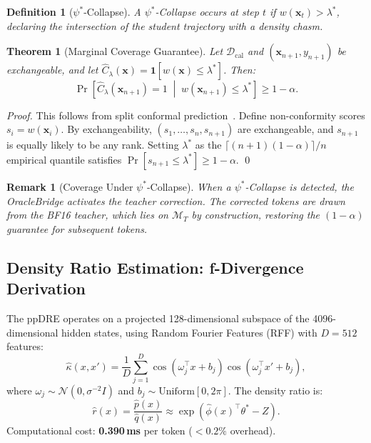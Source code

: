 \documentclass{uai2026}  %
\newtheorem{theorem}{Theorem}
\newtheorem{definition}{Definition}
\newtheorem{remark}{Remark}
\begin{document}
\begin{definition}[$\psi^*$-Collapse]
A $\psi^*$\emph{-Collapse} occurs at step $t$ if
$w(\mathbf{x}_t) > \lambda^*$, declaring the intersection
of the student trajectory with a density chasm.
\end{definition}

\begin{theorem}[Marginal Coverage Guarantee]
\label{thm:coverage}
Let $\mathcal{D}_\text{cal}$ and $(\mathbf{x}_{n+1}, y_{n+1})$ be
exchangeable, and let $\hat{C}_\lambda(\mathbf{x}) =
\mathbf{1}[w(\mathbf{x}) \leq \lambda^*]$.
Then:
\begin{equation}
  \Pr\!\left[\hat{C}_\lambda(\mathbf{x}_{n+1}) = 1 \;\middle|\;
    w(\mathbf{x}_{n+1}) \leq \lambda^*\right] \geq 1 - \alpha.
\end{equation}
\end{theorem}

\begin{proof}
This follows from split conformal prediction~\cite{angelopoulos2022conformal}.
Define non-conformity scores $s_i = w(\mathbf{x}_i)$.
By exchangeability, $(s_1, \ldots, s_n, s_{n+1})$ are exchangeable,
and $s_{n+1}$ is equally likely to be any rank.
Setting $\lambda^*$ as the
$\lceil(n+1)(1-\alpha)\rceil / n$ empirical quantile satisfies
$\Pr[s_{n+1} \leq \lambda^*] \geq 1 - \alpha$. \qed
\end{proof}

\begin{remark}[Coverage Under $\psi^*$-Collapse]
When a $\psi^*$-Collapse is detected, the OracleBridge activates
the teacher correction. The corrected tokens are drawn from the
BF16 teacher, which lies on $\mathcal{M}_T$ by construction,
restoring the $(1-\alpha)$ guarantee for subsequent tokens.
\end{remark}

\subsection{Density Ratio Estimation: f-Divergence Derivation}

The ppDRE operates on a projected 128-dimensional subspace of the
4096-dimensional hidden states, using Random Fourier Features (RFF)
with $D=512$ features:
\begin{equation}
  \hat{\kappa}(x, x') = \frac{1}{D} \sum_{j=1}^{D}
    \cos(\omega_j^\top x + b_j) \cos(\omega_j^\top x' + b_j),
\end{equation}
where $\omega_j \sim \mathcal{N}(0, \sigma^{-2} I)$ and
$b_j \sim \text{Uniform}[0, 2\pi]$.
The density ratio is:
\begin{equation}
  \hat{r}(x) = \frac{\hat{p}(x)}{\hat{q}(x)} \approx
    \exp\!\left(\hat{\phi}(x)^\top \theta^* - Z\right).
\end{equation}
Computational cost: \textbf{0.390\,ms} per token ($<0.2\%$ overhead).
\end{document}
